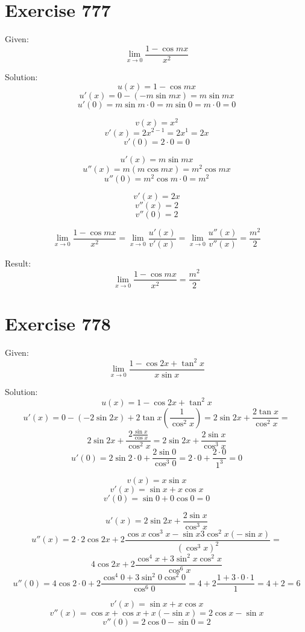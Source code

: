 \documentclass[a4paper, 10pt]{scrartcl}
\begin{document}
\section{Exercise 777}

Given:
\[
\lim_{x\to 0}{\frac{1 - \cos{mx}}{x^{2}}}
\]

Solution:
\[
u(x) = 1 - \cos{mx}
\]
\[
u'(x) = 0 - (-m\sin{mx}) = m\sin{mx}
\]
\[
u'(0) = m\sin{m\cdot 0} = m\sin{0} = m\cdot 0 = 0
\]

\[
v(x) = x^{2}
\]
\[
v'(x) = 2x^{2 - 1} = 2x^{1} = 2x
\]
\[
v'(0) = 2\cdot 0 = 0
\]

\[
u'(x) = m\sin{mx}
\]
\[
u''(x) = m(m\cos{mx}) = m^{2}\cos{mx}
\]
\[
u''(0) = m^{2}\cos{m\cdot 0} = m^{2}
\]

\[
v'(x) = 2x
\]
\[
v''(x) = 2
\]
\[
v''(0) = 2
\]

\[
\lim_{x\to 0}{\frac{1 - \cos{mx}}{x^{2}}} = \lim_{x\to 0}{\frac{u'(x)}{v'(x)}} = \lim_{x\to 0}{\frac{u''(x)}{v''(x)}}
= \frac{m^{2}}{2}
\]

Result:
\[
\lim_{x\to 0}{\frac{1 - \cos{mx}}{x^{2}}} = \frac{m^{2}}{2}
\]

\section{Exercise 778}

Given:
\[
\lim_{x\to 0}{\frac{1 - \cos{2x} + \tan^{2}{x}}{x\sin{x}}}
\]

Solution:
\[
u(x) = 1 - \cos{2x} + \tan^{2}{x}
\]
\[
u'(x) = 0 - (-2\sin{2x}) + 2\tan{x}(\frac{1}{\cos^{2}{x}}) = 2\sin{2x} + \frac{2\tan{x}}{\cos^{2}{x}} =
\]
\[
2\sin{2x} + \frac{2\frac{\sin{x}}{\cos{x}}}{\cos^{2}{x}} = 2\sin{2x} + \frac{2\sin{x}}{\cos^{3}{x}}
\]
\[
u'(0) = 2\sin{2\cdot 0} + \frac{2\sin{0}}{\cos^{3}{0}} = 2\cdot 0 + \frac{2\cdot 0}{1^{3}} = 0
\]

\[
v(x) = x\sin{x}
\]
\[
v'(x) = \sin{x} + x\cos{x}
\]
\[
v'(0) = \sin{0} + 0\cos{0} = 0
\]

\[
u'(x) = 2\sin{2x} + \frac{2\sin{x}}{\cos^{3}{x}}
\]
\[
u''(x) = 2\cdot 2\cos{2x} + 2\frac{\cos{x}\cos^{3}{x} - \sin{x}3\cos^{2}{x}(-\sin{x})}{(\cos^{3}{x})^{2}} =
\]
\[
4\cos{2x} + 2\frac{\cos^{4}{x} + 3\sin^{2}{x}\cos^{2}{x}}{\cos^{6}{x}}
\]
\[
u''(0) = 4\cos{2\cdot 0} + 2\frac{\cos^{4}{0} + 3\sin^{2}{0}\cos^{2}{0}}{\cos^{6}{0}} = 4 + 2\frac{1 + 3\cdot 0\cdot 1}{1} = 4 + 2 = 6
\]

\[
v'(x) = \sin{x} + x\cos{x}
\]
\[
v''(x) = \cos{x} + \cos{x} + x(-\sin{x}) = 2\cos{x} - \sin{x}
\]
\[
v''(0) = 2\cos{0} - \sin{0} = 2
\]
\end{document}
